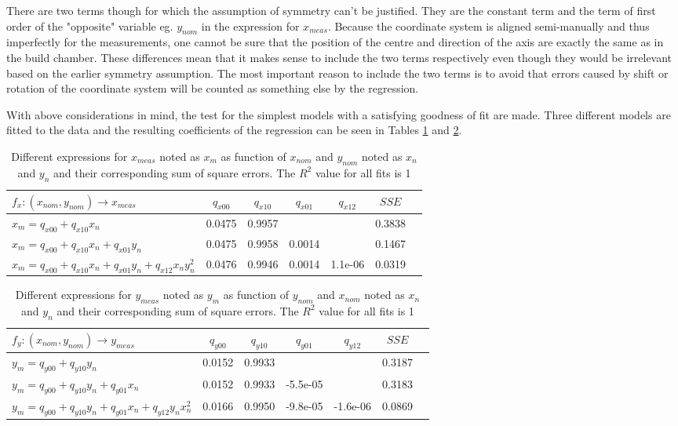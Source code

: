 There are two terms though for which the assumption of symmetry can't be justified. They are the constant term and the term of first order of the "opposite" variable eg. $y_{nom}$ in the expression for $x_{meas}$. Because the coordinate system is aligned semi-manually and thus imperfectly for the measurements, one cannot be sure that the position of the centre and direction of the axis are exactly the same as in the build chamber. These differences mean that it makes sense to include the two terms respectively even though they would be irrelevant based on the earlier symmetry assumption. The most important reason to include the two terms is to avoid that errors caused by shift or rotation of the coordinate system will be counted as something else by the regression.

With above considerations in mind, the test for the simplest models with a satisfying goodness of fit are made. Three different models are fitted to the data and the resulting coefficients of the regression can be seen in Tables \ref{tab:cal-fits-x} and \ref{tab:cal-fits-y}.

\begin{table}[ht]
    \begin{tabular}{l|cccc|c|c}
        $f_x: (x_{nom}, y_{nom}) \rightarrow x_{meas}$ & 
        $q_{x00}$ & $q_{x10}$ & $q_{x01}$ & $q_{x12}$ & $SSE$ \\
        \hline $x_m = q_{x00} + q_{x10}x_n$ & 
        0.0475 & 0.9957 &            &            & 0.3838\\  
        $x_m = q_{x00} + q_{x10}x_n + q_{x01}y_n$ & 
        0.0475 & 0.9958 & 0.0014 &            & 0.1467\\
        $x_m = q_{x00} + q_{x10}x_n + q_{x01}y_n + q_{x12}x_ny_n^2$ & 
        0.0476 & 0.9946 & 0.0014 & 1.1e-06 & 0.0319
    \end{tabular}
    \caption{Different expressions for $x_{meas}$ noted as $x_{m}$ as function of $x_{nom}$ and $y_{nom}$ noted as $x_{n}$ and $y_{n}$ and their corresponding sum of square errors. The $R^2$ value for all fits is 1}
    \label{tab:cal-fits-x}
\end{table}
\begin{table}[ht]
    \begin{tabular}{l|cccc|c|c}
        $f_y: (x_{nom}, y_{nom}) \rightarrow y_{meas}$ & 
        $q_{y00}$ & $q_{y10}$ & $q_{y01}$ & $q_{y12}$ & $SSE$ \\
        \hline $y_m = q_{y00} + q_{y10}y_n$ & 
        0.0152 & 0.9933 &            &            & 0.3187\\  
        $y_m = q_{y00} + q_{y10}y_n + q_{y01}x_n$ & 
        0.0152 & 0.9933 & -5.5e-05 &            & 0.3183\\
        $y_m = q_{y00} + q_{y10}y_n + q_{y01}x_n + q_{y12}y_nx_n^2$ & 
        0.0166 & 0.9950 & -9.8e-05 & -1.6e-06 & 0.0869
    \end{tabular}
    \caption{Different expressions for $y_{meas}$ noted as $y_{m}$ as function of $y_{nom}$ and $x_{nom}$ noted as $x_{n}$ and $y_{n}$ and their corresponding sum of square errors. The $R^2$ value for all fits is 1}
    \label{tab:cal-fits-y}
\end{table}

